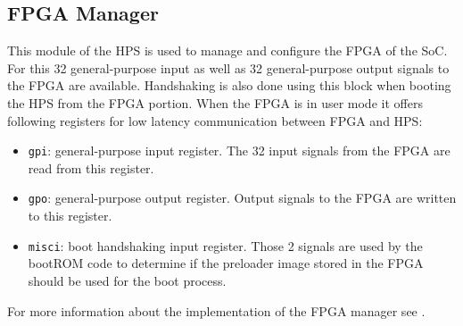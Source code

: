 \subsection{FPGA Manager}
This module of the HPS is used to manage and configure the FPGA of the SoC. For this 32 general-purpose input as well as 32 general-purpose output signals to the FPGA are available. Handshaking is also done using this block when booting the HPS from the FPGA portion. When the FPGA is in user mode it offers following registers for low latency communication between FPGA and HPS:
\begin{itemize}
\item \texttt{gpi}: general-purpose input register. The 32 input signals from the FPGA are read from this register.
\item \texttt{gpo}: general-purpose output register. Output signals to the FPGA are written to this register.
\item \texttt{misci}: boot handshaking input register. Those 2 signals are used by the bootROM code to determine if the preloader image stored in the FPGA should be used for the boot process.
\end{itemize}
For more information about the implementation of the FPGA manager see \cite[chapter 5]{AlteraHPS15}.
